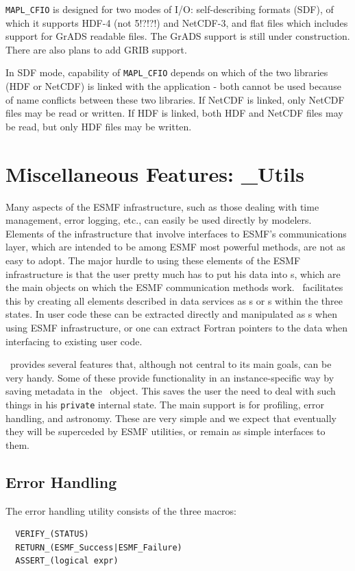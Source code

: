 {\tt MAPL\_CFIO} is designed for two modes of I/O: self-describing formats
(SDF), of which it supports HDF-4 (not 5!?!?!) and NetCDF-3, and flat files
which includes support for GrADS readable files. The GrADS support is still
under construction. There are also plans to add GRIB support. 

In SDF mode, capability of {\tt MAPL\_CFIO} depends on which of the two
libraries (HDF or NetCDF) is linked with the application - both cannot
be used because of name conflicts between these two libraries. If NetCDF is
linked, only NetCDF  files may be read or written. If HDF is linked, both HDF 
and NetCDF files may be read, but only HDF files may be written.


\section{Miscellaneous Features: \ggn\_{Utils}}

Many aspects of the ESMF infrastructure, such as those dealing with
time management, error logging, etc., can easily be used directly by
modelers. Elements of the infrastructure that involve interfaces to
ESMF's communications layer, which are intended to be among ESMF most
powerful methods, are not as easy to adopt. The major hurdle to using
these elements of the ESMF infrastructure is that the user pretty much
has to put his data into \fld s, which are the main objects on
which the ESMF communication methods work. \ggn\  facilitates this by
creating all elements described in data services as \fld s or \bdl s
within the three states. In user code these can be extracted directly
and manipulated as \fld s when using ESMF infrastructure,
or one can extract Fortran pointers to the data when interfacing to 
existing user code. 


\ggn\  provides several features that, although not central to its main 
goals, can be very handy. Some of these provide
functionality in an instance-specific way by saving metadata in the
\ggn\  object. This saves the user the need to deal with such things in
his \texttt{private} internal state. The main support is for profiling, error
handling, and astronomy. These are very simple and we expect that
eventually they will be superceded by ESMF utilities, or remain as
simple interfaces to them.

\subsection{Error Handling}
The error handling utility consists of the three macros:
\begin{verbatim}
  VERIFY_(STATUS)
  RETURN_(ESMF_Success|ESMF_Failure)
  ASSERT_(logical expr)
\end{verbatim}

